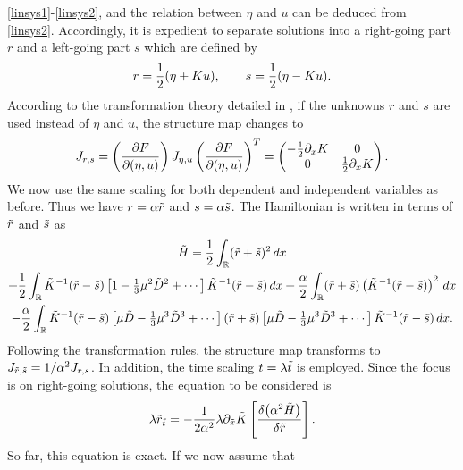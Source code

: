 \eqref{linsys1}-\eqref{linsys2},
and the relation between $\eta$ and $u$ can be deduced from \eqref{linsys2}.
%
%
Accordingly, it is expedient to separate solutions
into a right-going part $r$ and a left-going part $s$
which are defined by
\begin{align*}
r = \frac{1}{2} (\eta + K  u), \qquad
s = \frac{1}{2} (\eta - K  u). 
\end{align*}
According to the transformation theory detailed in \cite{Craig2005}, 
if the unknowns $r$ and $s$ are used instead of $\eta$ and $u$,
the structure map changes to 
\begin{equation}
J_{r,s} = \left( \frac{\partial F}{\partial (\eta, u)} \right) J_{\eta, u}  
\left( \frac{\partial F}{\partial (\eta, u)} \right)^T
= 
\begin{pmatrix}
-\frac{1}{2} \partial_x K & 0\\
0 & \frac{1}{2} \partial_x K
\end{pmatrix}.
\end{equation}
%
\noindent 
We now use the same scaling for both dependent and independent variables as before.
Thus we have $r = \alpha\tilde{r}$ and $s = \alpha\tilde{s}$. 
%
%
%
%
The Hamiltonian is written in terms of $\tilde{r}$ and $\tilde{s}$ as
\begin{multline*}
\tilde{H} = \frac{1}{2} \int_{\mathbb{R}} (\tilde{r}+\tilde{s})^2 \, dx
\\
 + \frac{1}{2} \int_{\mathbb{R}} \tilde{K}^{-1}(\tilde{r}-\tilde{s}) \left[ 1 - {\textstyle{\frac{1}{3}}} \mu^2 \tilde{D}^2 + \cdots \right] \tilde{K}^{-1}(\tilde{r}-\tilde{s}) \, dx
 + \frac{\alpha}{2} \int_{\mathbb{R}}  (\tilde{r}+\tilde{s}) \left(\tilde{K}^{-1}(\tilde{r}-\tilde{s})\right)^2 \, dx
\\
 - \frac{\alpha}{2} \int_{\mathbb{R}}  \tilde{K}^{-1}(\tilde{r}-\tilde{s}) \left[ \mu \tilde{D} - {\textstyle{\frac{1}{3}}} \mu^3\tilde{D}^3 +  \cdots \right] (\tilde{r}+\tilde{s})
   \left[ \mu \tilde{D} - {\textstyle{\frac{1}{3}}} \mu^3\tilde{D}^3 + \cdots \right] \tilde{K}^{-1}(\tilde{r}-\tilde{s}) \, dx. 
\end{multline*}
%
%
%
%
%
Following the transformation rules, the structure map transforms to
$J_{\tilde{r},\tilde{s}} = 1/\alpha^2 J_{r,s}$. 
In addition, the time scaling $t = \lambda \tilde{t}$ is employed. 
Since the focus is on right-going solutions, the equation to be considered is
\begin{equation}
\lambda \tilde{r}_{\tilde{t}} 
= -\frac{1}{2\alpha^2}\lambda\partial_{\tilde{x}} \tilde{K} \left[ \frac{\delta \big( \alpha^2 \tilde{H} \big)}{\delta \tilde{r}} \right].
\end{equation}
So far, this equation is exact. If we now assume that 
